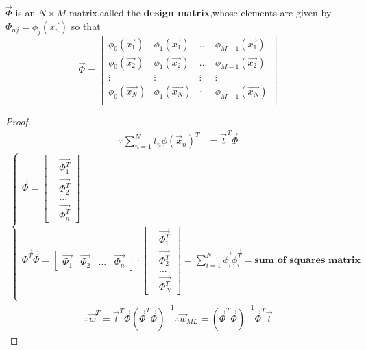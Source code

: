 $\vec{\Phi}$ is an $N\times M$ matrix,called the \textbf{design matrix},whose elements are given by $\Phi_{nj}=\phi_j(\vec{x_n})$ so that
\begin{equation}
\vec{\Phi}=
\begin{bmatrix}
\phi_0(\vec{x_1}) &	\phi_1(\vec{x_1}) &...&\phi_{M-1}(\vec{x_1}) \\
\phi_0(\vec{x_2}) & \phi_1(\vec{x_2}) &...&\phi_{M-1}(\vec{x_2}) \\
\vdots &\vdots &\vdots&\vdots \\
\phi_0(\vec{x_N})& \phi_1(\vec{x_{N}})& \cdot &\phi_{M-1}(\vec{x_N})\\
\end{bmatrix}
\end{equation}

\begin{proof}
\begin{align}
\because \sum_{n=1}^{N}t_n\phi(\vec{x}_n)^T &=\vec{t}^T\vec{\Phi}
\end{align}
\begin{align}	
\begin{cases}
\vec{\Phi} = \begin{bmatrix}
&\vec{\Phi_1^T} \\
&\vec{\Phi_2^T} \\
& ... \\
&\vec{\Phi_n^T}
\end{bmatrix} \\	
\vec{\Phi^T}\vec{\Phi} =
\begin{bmatrix}
\vec{\Phi_1} & \vec{\Phi_2} & ...&\vec{\Phi_n}
\end{bmatrix} 
\cdot
\begin{bmatrix}
&\vec{\Phi_1^T} \\
&\vec{\Phi_2^T} \\
& ... \\
&\vec{\Phi_N^T}
\end{bmatrix}  = \sum\limits_{i=1}^{N}\vec{\phi_i}\vec{\phi_i^T} = \textbf{sum of squares matrix} \\
\end{cases}
\end{align}
\begin{align}
\therefore 
\vec{w}^T = \vec{t}^T\vec{\Phi}(\vec{\Phi}^T\vec{\Phi})^{-1}
\therefore
\vec{w}_{ML}=(\vec{\Phi}^T\vec{\Phi})^{-1}\vec{\Phi}^T\vec{t}
\end{align}	
\end{proof}


